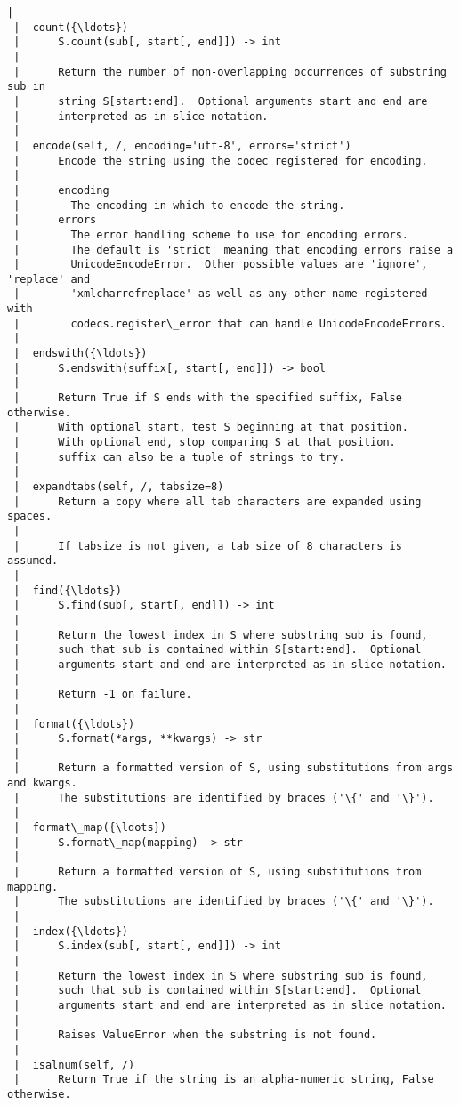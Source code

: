 \begin{Verbatim}[commandchars=\\\{\}]
 |  
 |  count({\ldots})
 |      S.count(sub[, start[, end]]) -> int
 |      
 |      Return the number of non-overlapping occurrences of substring sub in
 |      string S[start:end].  Optional arguments start and end are
 |      interpreted as in slice notation.
 |  
 |  encode(self, /, encoding='utf-8', errors='strict')
 |      Encode the string using the codec registered for encoding.
 |      
 |      encoding
 |        The encoding in which to encode the string.
 |      errors
 |        The error handling scheme to use for encoding errors.
 |        The default is 'strict' meaning that encoding errors raise a
 |        UnicodeEncodeError.  Other possible values are 'ignore', 'replace' and
 |        'xmlcharrefreplace' as well as any other name registered with
 |        codecs.register\_error that can handle UnicodeEncodeErrors.
 |  
 |  endswith({\ldots})
 |      S.endswith(suffix[, start[, end]]) -> bool
 |      
 |      Return True if S ends with the specified suffix, False otherwise.
 |      With optional start, test S beginning at that position.
 |      With optional end, stop comparing S at that position.
 |      suffix can also be a tuple of strings to try.
 |  
 |  expandtabs(self, /, tabsize=8)
 |      Return a copy where all tab characters are expanded using spaces.
 |      
 |      If tabsize is not given, a tab size of 8 characters is assumed.
 |  
 |  find({\ldots})
 |      S.find(sub[, start[, end]]) -> int
 |      
 |      Return the lowest index in S where substring sub is found,
 |      such that sub is contained within S[start:end].  Optional
 |      arguments start and end are interpreted as in slice notation.
 |      
 |      Return -1 on failure.
 |  
 |  format({\ldots})
 |      S.format(*args, **kwargs) -> str
 |      
 |      Return a formatted version of S, using substitutions from args and kwargs.
 |      The substitutions are identified by braces ('\{' and '\}').
 |  
 |  format\_map({\ldots})
 |      S.format\_map(mapping) -> str
 |      
 |      Return a formatted version of S, using substitutions from mapping.
 |      The substitutions are identified by braces ('\{' and '\}').
 |  
 |  index({\ldots})
 |      S.index(sub[, start[, end]]) -> int
 |      
 |      Return the lowest index in S where substring sub is found, 
 |      such that sub is contained within S[start:end].  Optional
 |      arguments start and end are interpreted as in slice notation.
 |      
 |      Raises ValueError when the substring is not found.
 |  
 |  isalnum(self, /)
 |      Return True if the string is an alpha-numeric string, False otherwise.

\end{Verbatim}
